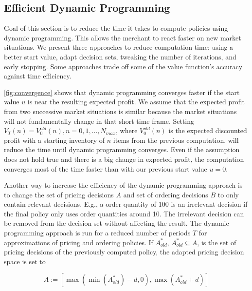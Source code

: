 \subsection{Efficient Dynamic Programming}
\label{section:faster_dyn_prog}
Goal of this section is to reduce the time it takes to compute policies using dynamic programming.
This allows the merchant to react faster on new market situations.
We present three approaches to reduce computation time: using a better start value, adapt decision sets, tweaking the number of iterations, and early stopping.
Some approaches trade off some of the value function's accuracy against time efficiency.

\cref{fig:convergence} shows that dynamic programming converges faster if the start value $u$ is near the resulting expected profit.
We assume that the expected profit from two successive market situations is similar because the market situations will not fundamentally change in that short time frame.
Setting $V_T(n) = V_0^{old}(n), n=0, 1, \ldots, N_{max}$, where $V_0^{old}(n)$ is the expected discounted profit with a starting inventory of $n$ items from the previous computation, will reduce the time until dynamic programming converges.
Even if the assumption does not hold true and there is a big change in expected profit, the computation converges most of the time faster than with our previous start value $u = 0$.

Another way to increase the efficiency of the dynamic programming approach is to change the set of pricing decisions $A$ and set of ordering decisions $B$ to only contain relevant decisions.
E.g., a order quantity of 100 is an irrelevant decision if the final policy only uses order quantities around 10.
The irrelevant decision can be removed from the decision set without affecting the result.
The dynamic programming approach is run for a reduced number of periods $T$ for approximations of pricing and ordering policies.
If $A^*_{old}$, $A^*_{old} \subseteq A$, is the set of pricing decisions of the previously computed policy, the adapted pricing decision space is set to

\begin{equation}
A := [\max(\min(A^*_{old}) - d, 0), \max(A^*_{old} + d)]
\end{equation}


